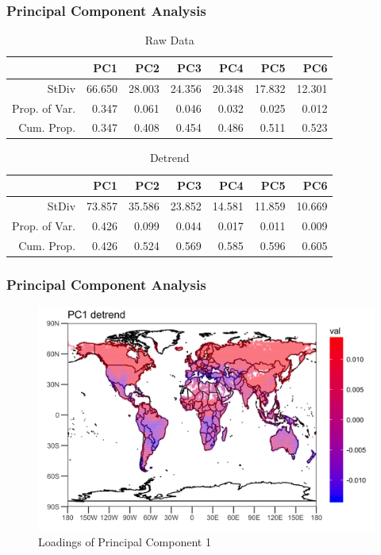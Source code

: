 \documentclass{beamer}
\begin{document}
\begin{frame}
\frametitle{Principal Component Analysis}
\begin{table}[ht]
\centering
\begin{tabular}{rrrrrrr}
\hline
& PC1 & PC2 & PC3 & PC4 & PC5 & PC6 \\ 
\hline
StDiv & 66.650 & 28.003 & 24.356 & 20.348 & 17.832 & 12.301 \\ 
Prop. of Var. & 0.347 & 0.061 & 0.046 & 0.032 & 0.025 & 0.012 \\ 
Cum. Prop.& 0.347 & 0.408 & 0.454 & 0.486 & 0.511 & 0.523 \\ 
\hline
\end{tabular}
\caption{Raw Data}
\end{table}
\begin{table}[ht]
\centering
\begin{tabular}{rrrrrrr}
\hline
& PC1 & PC2 & PC3 & PC4 & PC5 & PC6 \\ 
\hline
StDiv & 73.857 & 35.586 & 23.852 & 14.581 & 11.859 & 10.669 \\ 
Prop. of Var. & 0.426 & 0.099 & 0.044 & 0.017 & 0.011 & 0.009 \\ 
Cum. Prop. & 0.426 & 0.524 & 0.569 & 0.585 & 0.596 & 0.605 \\ 
\hline
\end{tabular}
\caption{Detrend}
\end{table}
\end{frame}



\begin{frame}
\frametitle{Principal Component Analysis}
\begin{figure}
\centering
\includegraphics[width=0.9\linewidth]{../img/loading_PC1_de}
\caption{Loadings of Principal Component 1}
\label{fig:loadingpc1}
\end{figure}
\end{frame}
\end{document}
